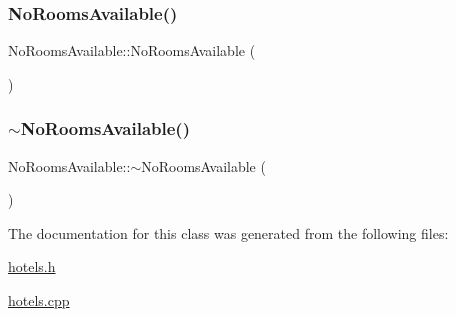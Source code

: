 \subsubsection{\texorpdfstring{No\+Rooms\+Available()}{NoRoomsAvailable()}}
{\footnotesize\ttfamily No\+Rooms\+Available\+::\+No\+Rooms\+Available (\begin{DoxyParamCaption}{ }\end{DoxyParamCaption})\hspace{0.3cm}{\ttfamily [inline]}}

\mbox{\label{class_no_rooms_available_af059ca2ab2857824276a1c16426ac13e}} 
\subsubsection{\texorpdfstring{$\sim$\+No\+Rooms\+Available()}{~NoRoomsAvailable()}}
{\footnotesize\ttfamily No\+Rooms\+Available\+::$\sim$\+No\+Rooms\+Available (\begin{DoxyParamCaption}{ }\end{DoxyParamCaption})\hspace{0.3cm}{\ttfamily [virtual]}}



The documentation for this class was generated from the following files\+:\begin{DoxyCompactItemize}
\item 
\hyperlink{hotels_8h}{hotels.\+h}\item 
\hyperlink{hotels_8cpp}{hotels.\+cpp}\end{DoxyCompactItemize}
